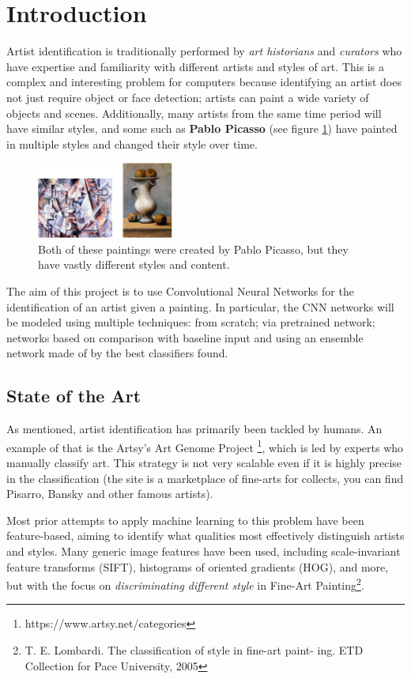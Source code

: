 \section{Introduction}
Artist identification is traditionally performed by \textit{art historians} and \textit{curators} who have expertise and familiarity with different artists and styles of art. This is a complex and interesting problem for computers because identifying an artist does not just require object or face detection; artists can paint a wide variety of objects and scenes. Additionally, many artists from the same time period will have similar styles, and some such as \textbf{Pablo Picasso} (see figure \ref{fig:picasso}) have painted in multiple styles and changed their style over time.

\begin{figure}[H]
	\centering
	\includegraphics[width=0.4\textwidth]{img/picasso.png}
	\caption{Both of these paintings were created by Pablo Picasso, but they have vastly different styles and content.}
	\label{fig:picasso}
\end{figure}

\noindent The aim of this project is to use Convolutional Neural Networks for the identification of an artist given a painting. In particular, the CNN networks will be modeled using multiple techniques: from scratch; via pretrained network; networks based on comparison with baseline input and using an ensemble network made of by the best classifiers found.


\subsection{State of the Art}
As mentioned, artist identification has primarily been tackled by humans. An example of that is the Artsy's Art Genome Project \footnote{https://www.artsy.net/categories}, which is led by experts who manually classify art. This strategy is not very scalable even if it is highly precise in the classification (the site is a marketplace of fine-arts for collects, you can find Pisarro, Bansky and other famous artists).

Most prior attempts to apply machine learning to this problem have been feature-based, aiming to identify what qualities most effectively distinguish artists and styles. Many generic image features have been used, including scale-invariant feature transforms (SIFT), histograms of oriented gradients (HOG), and more, but with the focus on \textit{discriminating different style} in Fine-Art Painting\footnote{T. E. Lombardi. The classification of style in fine-art paint-
ing. ETD Collection for Pace University, 2005}.

